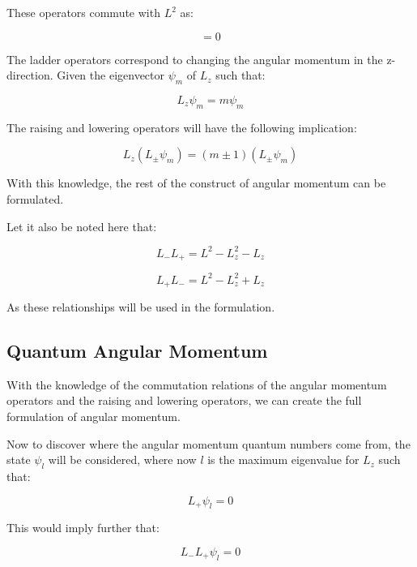 \documentclass{article}
\begin{document}
These operators commute with $L^2$ as:

\begin{equation}
[L^2, L_{\pm}] = 0
\end{equation}

The ladder operators correspond to changing the angular momentum in the z-direction. Given the eigenvector $\psi_{m}$ of $L_z$ such that:

\begin{equation}
L_z\psi_{m} = m\psi_{m} 
\end{equation}

The raising and lowering operators will have the following implication:

\begin{equation}
L_z(L_{\pm}\psi_{m}) = (m \pm 1)(L_{\pm}\psi_{m})
\end{equation}

With this knowledge, the rest of the construct of angular momentum can be formulated.

Let it also be noted here that:

\begin{equation}
L_-L_+ = L^2 - L_z^2 - L_z
\end{equation}

\begin{equation}
L_+L_- = L^2 - L_z^2 + L_z
\end{equation}

As these relationships will be used in the formulation.

\subsection{Quantum Angular Momentum}
With the knowledge of the commutation relations of the angular momentum operators and the raising and lowering operators, we can create the full formulation of angular momentum.

Now to discover where the angular momentum quantum numbers come from, the state $\psi_l$ will be considered, where now $l$ is the maximum eigenvalue for $L_z$ such that:

\begin{equation}
L_+\psi_{l} = 0 
\end{equation}

This would imply further that:

\begin{equation}
L_-L_+\psi_{l} = 0 
\end{equation}
\end{document}
